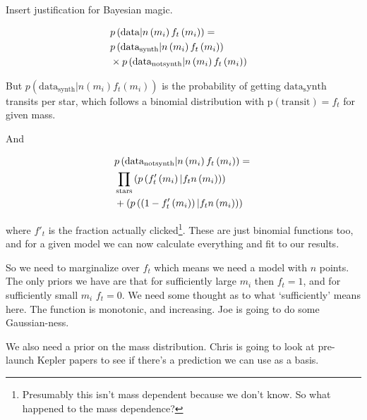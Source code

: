 \documentclass[useAMS,usenatbib,a4paper]{mn2e}
\begin{document}
Insert justification for Bayesian magic.

\begin{eqnarray}
\lefteqn{p\left(\mathrm{data}|n\left(m_i\right)f_t\left(m_i\right)\right)=} \nonumber \\ & p\left(\mathrm{data_{synth}}|n\left(m_i\right)f_t\left(m_i\right)\right) \nonumber  \\ & \times p\left(\mathrm{data_{notsynth}}|n\left(m_i\right)f_t\left(m_i\right)\right)
\end{eqnarray}

But $p\left(\mathrm{data_{synth}}|n\left(m_i\right)f_t\left(m_i\right)\right)$ is the probability of getting $\mathrm{data_synth}$ transits per star, which follows a binomial distribution with $\mathrm{p\left(transit\right)}=f_t$ for given mass. 

And

\begin{eqnarray}
\lefteqn{p\left(\mathrm{data_{notsynth}}|n\left(m_i\right)f_t\left(m_i\right)\right)=} \nonumber \\ & \prod_{\mathrm{stars}}\left(p\left(f'_t\left(m_i\right)|f_tn\left(m_i\right)\right)\right) \nonumber \\ & + \left(p\left(\left(1-f'_t\left(m_i\right)\right)|f_tn\left(m_i\right)\right)\right)
\end{eqnarray}

where $f'_t$ is the fraction actually clicked\footnote{Presumably this isn't mass dependent because we don't know. So what happened to the mass dependence?}. These are just binomial functions too, and for a given model we can now calculate everything and fit to our results. 

So we need to marginalize over $f_t$ which means we need a model with $n$ points. The only priors we have are that for sufficiently large $m_i$ then $f_t=1$, and for sufficiently small $m_i$ $f_t=0$. We need some thought as to what `sufficiently' means here. The function is monotonic, and increasing. Joe is going to do some Gaussian-ness.

We also need a prior on the mass distribution. Chris is going to look at pre-launch Kepler papers to see if there's a prediction we can use as a basis. 



\begin{thebibliography}{99}


\end{thebibliography}

\label{lastpage}
\end{document}
